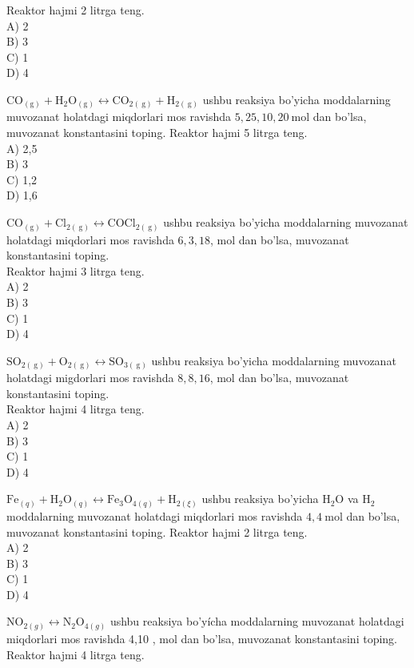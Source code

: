 Reaktor hajmi 2 litrga teng.\\
A) 2\\
B) 3\\
C) 1\\
D) 4
  \item $\mathrm{CO}_{(\mathrm{g})}+\mathrm{H}_{2} \mathrm{O}_{(\mathrm{g})} \leftrightarrow \mathrm{CO}_{2(\mathrm{~g})}+\mathrm{H}_{2(\mathrm{~g})}$ ushbu reaksiya bo'yicha moddalarning muvozanat holatdagi miqdorlari mos ravishda $5,25,10,20 \mathrm{~mol}$ dan bo'lsa, muvozanat konstantasini toping. Reaktor hajmi 5 litrga teng.\\
A) 2,5\\
B) 3\\
C) 1,2\\
D) 1,6
  \item $\mathrm{CO}_{(\mathrm{g})}+\mathrm{Cl}_{2(\mathrm{~g})} \leftrightarrow \mathrm{COCl}_{2(\mathrm{~g})}$ ushbu reaksiya bo'yicha moddalarning muvozanat holatdagi miqdorlari mos ravishda $6,3,18$, mol dan bo'lsa, muvozanat konstantasini toping.\\
Reaktor hajmi 3 litrga teng.\\
A) 2\\
B) 3\\
C) 1\\
D) 4
  \item $\mathrm{SO}_{2(\mathrm{~g})}+\mathrm{O}_{2(\mathrm{~g})} \leftrightarrow \mathrm{SO}_{3(\mathrm{~g})}$ ushbu reaksiya bo'yicha moddalarning muvozanat\\
holatdagi migdorlari mos ravishda $8,8,16$, mol dan bo'lsa, muvozanat konstantasini toping.\\
Reaktor hajmi 4 litrga teng.\\
A) 2\\
B) 3\\
C) 1\\
D) 4
  \item $\mathrm{Fe}_{(q)}+\mathrm{H}_{2} \mathrm{O}_{(q)} \leftrightarrow \mathrm{Fe}_{3} \mathrm{O}_{4(q)}+\mathrm{H}_{2(\xi)}$ ushbu reaksiya bo'yicha $\mathrm{H}_{2} \mathrm{O}$ va $\mathrm{H}_{2}$ moddalarning muvozanat holatdagi miqdorlari mos ravishda $4,4 \mathrm{~mol}$ dan bo'lsa, muvozanat konstantasini toping. Reaktor hajmi 2 litrga teng.\\
A) 2\\
B) 3\\
C) 1\\
D) 4
  \item $\mathrm{NO}_{2(g)} \leftrightarrow \mathrm{N}_{2} \mathrm{O}_{4(g)}$ ushbu reaksiya bo'yícha moddalarning muvozanat holatdagi miqdorlari mos ravishda 4,10 , mol dan bo'lsa, muvozanat konstantasini toping. Reaktor hajmi 4 litrga teng.\\
